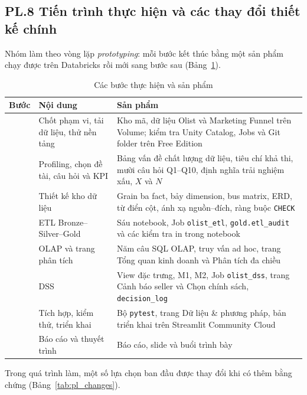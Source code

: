 \documentclass[a4paper]{article}
\begin{document}
\clearpage
{}
\label{pl:8}
\subsection*{PL.8 Tiến trình thực hiện và các thay đổi thiết kế chính}

Nhóm làm theo vòng lặp \textit{prototyping}: mỗi bước kết thúc bằng một sản phẩm chạy được trên Databricks rồi mới sang bước sau (Bảng~\ref{tab:pl_progress}).

\begin{table}[htbp]
\centering
\footnotesize
\setlength{\tabcolsep}{3pt}
\renewcommand{\arraystretch}{1.1}
\caption{Các bước thực hiện và sản phẩm}
\label{tab:pl_progress}
\begin{tabularx}{\textwidth}{@{}>{\raggedright\arraybackslash}p{0.6cm}>{\raggedright\arraybackslash}p{4.2cm}>{\raggedright\arraybackslash}X@{}}
\toprule
\textbf{Bước} & \textbf{Nội dung} & \textbf{Sản phẩm} \\
\midrule
1 & Chốt phạm vi, tải dữ liệu, thử nền tảng & Kho mã, dữ liệu Olist và Marketing Funnel trên Volume; kiểm tra Unity Catalog, Jobs và Git folder trên Free Edition \\
2 & Profiling, chọn đề tài, câu hỏi và KPI & Bảng vấn đề chất lượng dữ liệu, tiêu chí khả thi, mười câu hỏi Q1--Q10, định nghĩa trải nghiệm xấu, $X$ và $N$ \\
3 & Thiết kế kho dữ liệu & Grain ba fact, bảy dimension, bus matrix, ERD, từ điển cột, ánh xạ nguồn--đích, ràng buộc \texttt{CHECK} \\
4 & ETL Bronze--Silver--Gold & Sáu notebook, Job \texttt{olist\_\allowbreak{}etl}, \texttt{gold.etl\_\allowbreak{}audit} và các kiểm tra in trong notebook \\
5 & OLAP và trang phân tích & Năm câu SQL OLAP, truy vấn ad hoc, trang Tổng quan kinh doanh và Phân tích đa chiều \\
6 & DSS & View đặc trưng, M1, M2, Job \texttt{olist\_\allowbreak{}dss}, trang Cảnh báo seller và Chọn chính sách, \texttt{decision\_\allowbreak{}log} \\
7 & Tích hợp, kiểm thử, triển khai & Bộ \texttt{pytest}, trang Dữ liệu \& phương pháp, bản triển khai trên Streamlit Community Cloud \\
8 & Báo cáo và thuyết trình & Báo cáo, slide và buổi trình bày \\
\bottomrule
\end{tabularx}
\end{table}

Trong quá trình làm, một số lựa chọn ban đầu được thay đổi khi có thêm bằng chứng (Bảng~\ref{tab:pl_changes}).
\end{document}
